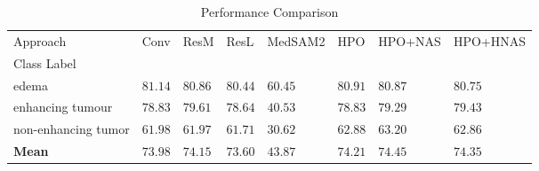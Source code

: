 \begin{table}
\caption{Performance Comparison}
\label{tab:results}
\begin{tabular}{llllllll}
\toprule
Approach & Conv & ResM & ResL & MedSAM2 & HPO & HPO+NAS & HPO+HNAS \\
Class Label &  &  &  &  &  &  &  \\
\midrule
edema & $\mathbf{81.14}$ & $80.86$ & $80.44$ & $60.45$ & $80.91$ & $80.87$ & $80.75$ \\
enhancing tumour & $78.83$ & $\mathbf{79.61}$ & $78.64$ & $40.53$ & $78.83$ & $79.29$ & $79.43$ \\
non-enhancing tumor & $61.98$ & $61.97$ & $61.71$ & $30.62$ & $62.88$ & $\mathbf{63.20}$ & $62.86$ \\
\textbf{Mean} & $73.98$ & $74.15$ & $73.60$ & $43.87$ & $74.21$ & $\mathbf{74.45}$ & $74.35$ \\
\bottomrule
\end{tabular}
\end{table}
